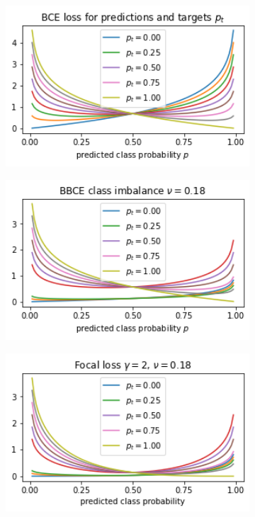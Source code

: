 \documentclass[10pt,conference,compsocconf]{IEEEtran}
\begin{document}
\begin{figure}[ht!]
    \centering
    \begin{subfigure}{0.324\columnwidth}
        \includegraphics[width=1\textwidth]{pictures/bce.png}
    \end{subfigure}
    \begin{subfigure}{0.324\columnwidth}
        \includegraphics[width=1\textwidth]{pictures/bbce.png}
    \end{subfigure}
    \begin{subfigure}{0.324\columnwidth}
        \includegraphics[width=1\textwidth]{pictures/focal.png}

\end{subfigure}
\end{figure}
\end{document}
